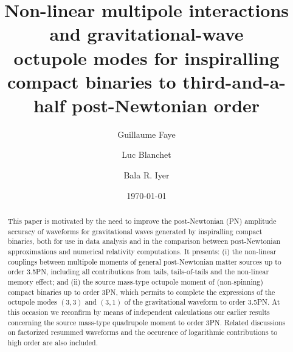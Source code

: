 \documentclass[prd,preprint,superscriptaddress,tightenlines,nofootinbib,
  eqsecnum,showpacs]{revtex4}
\begin{document}
\title{Non-linear multipole interactions and gravitational-wave
  \\octupole modes for inspiralling compact binaries to
  third-and-a-half post-Newtonian order}

\author{Guillaume Faye}

\author{Luc Blanchet}

\author{Bala R. Iyer}  

\date{\today}

\begin{abstract}
  This paper is motivated by the need to improve the post-Newtonian
  (PN) amplitude accuracy of waveforms for gravitational waves
  generated by inspiralling compact binaries, both for use in data
  analysis and in the comparison between post-Newtonian approximations
  and numerical relativity computations. It presents: (i) the
  non-linear couplings between multipole moments of general
  post-Newtonian matter sources up to order 3.5PN, including all
  contributions from tails, tails-of-tails and the non-linear memory
  effect; and (ii) the source mass-type octupole moment of
  (non-spinning) compact binaries up to order 3PN, which permits to
  complete the expressions of the octupole modes $(3,3)$ and $(3,1)$
  of the gravitational waveform to order 3.5PN. At this occasion we
  reconfirm by means of independent calculations our earlier results
  concerning the source mass-type quadrupole moment to order
  3PN. Related discussions on factorized resummed waveforms and the
  occurence of logarithmic contributions to high order are also
  included.
\end{abstract}


\maketitle
\end{document}
